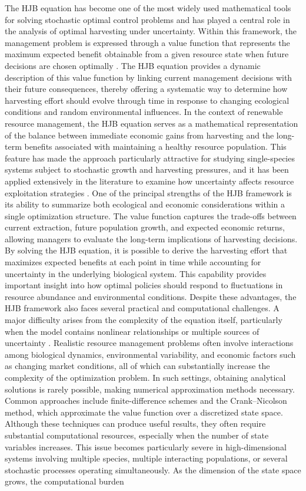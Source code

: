 \documentclass[11pt]{article}
\begin{document}
	The HJB equation has become one of the most widely used mathematical tools for solving stochastic optimal control problems and has played a central role in the analysis of optimal harvesting under uncertainty. Within this framework, the management problem is expressed through a value function that represents the maximum expected benefit obtainable from a given resource state when future decisions are chosen optimally \citep{pramanik2021,pramanik2022stochastic}. The HJB equation provides a dynamic description of this value function by linking current management decisions with their future consequences, thereby offering a systematic way to determine how harvesting effort should evolve through time in response to changing ecological conditions and random environmental influences. In the context of renewable resource management, the HJB equation serves as a mathematical representation of the balance between immediate economic gains from harvesting and the long-term benefits associated with maintaining a healthy resource population. This feature has made the approach particularly attractive for studying single-species systems subject to stochastic growth and harvesting pressures, and it has been applied extensively in the literature to examine how uncertainty affects resource exploitation strategies \citep{hening_tran_2020}. One of the principal strengths of the HJB framework is its ability to summarize both ecological and economic considerations within a single optimization structure. The value function captures the trade-offs between current extraction, future population growth, and expected economic returns, allowing managers to evaluate the long-term implications of harvesting decisions. By solving the HJB equation, it is possible to derive the harvesting effort that maximizes expected benefits at each point in time while accounting for uncertainty in the underlying biological system. This capability provides important insight into how optimal policies should respond to fluctuations in resource abundance and environmental conditions. Despite these advantages, the HJB framework also faces several practical and computational challenges. A major difficulty arises from the complexity of the equation itself, particularly when the model contains nonlinear relationships or multiple sources of uncertainty \citep{pramanik2023optimization001}. Realistic resource management problems often involve interactions among biological dynamics, environmental variability, and economic factors such as changing market conditions, all of which can substantially increase the complexity of the optimization problem. In such settings, obtaining analytical solutions is rarely possible, making numerical approximation methods necessary. Common approaches include finite-difference schemes and the Crank--Nicolson method, which approximate the value function over a discretized state space. Although these techniques can produce useful results, they often require substantial computational resources, especially when the number of state variables increases. This issue becomes particularly severe in high-dimensional systems involving multiple species, multiple interacting populations, or several stochastic processes operating simultaneously. As the dimension of the state space grows, the computational burden 
\end{document}
